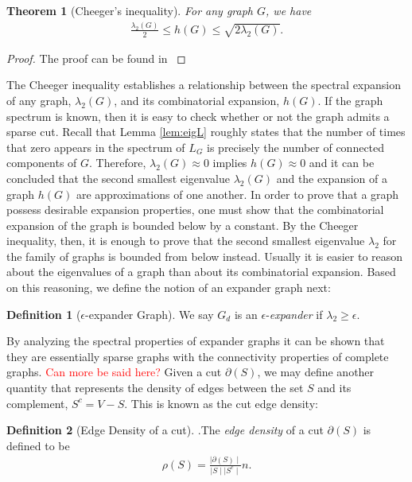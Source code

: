 \documentclass{amsart}
\newtheorem{theorem}{Theorem}
\theoremstyle{definition}
\newtheorem{definition}{Definition}
\theoremstyle{remark}
\numberwithin{equation}{section}
\begin{document}
\begin{theorem}[Cheeger's inequality] \label{thrm:cheeger}
For any graph $G$, we have
\begin{align}\label{eq:cheeger} 
\frac{\lambda_2(G)}{2} \leq h(G) \leq \sqrt{2 \lambda_2(G)}.	
\end{align}
\end{theorem}
\begin{proof}
The proof can be found in \cite{Chung97}
\end{proof}
The Cheeger inequality establishes a relationship between the spectral expansion of any graph, $\lambda_2 (G)$, and its combinatorial expansion, $h(G)$. If the graph spectrum is known, then it is easy to check whether or not the graph admits a sparse cut. Recall that Lemma \ref{lem:eigL} roughly states that the number of times that zero appears in the spectrum of $L_G$ is precisely the number of connected components of $G$. Therefore, $\lambda_2 (G) \approx 0$ implies $h(G) \approx 0$ and it can be concluded that the second smallest eigenvalue $\lambda_2 (G)$ and the expansion of a graph $h(G)$ are approximations of one another. 
In order to prove that a graph possess desirable expansion properties, one must show that the combinatorial expansion of the graph is bounded below by a constant. By the Cheeger inequality, then, it is enough to prove that the second smallest eigenvalue $\lambda_2$ for the family of graphs is bounded from below instead. Usually it is easier to reason about the eigenvalues of a graph than about its combinatorial expansion. Based on this reasoning, we define the notion of an expander graph next:
\begin{definition}[$\epsilon$-expander Graph]\label{def:expander}
We say $G_d$ is an $\epsilon$-\emph{expander} if $\lambda_2\geq \epsilon$.
\end{definition}
By analyzing the spectral properties of expander graphs it can be shown that they are essentially sparse graphs with the connectivity properties of complete graphs. \textcolor{red}{Can more be said here?} Given a cut $\partial (S)$, we may define another quantity that represents the density of edges between the set $S$ and its complement, $S^c = V-S$. This is known as the cut edge density: 
\begin{definition}[Edge Density of a cut].\label{def:edgedensity} The \textit{edge density} of a cut $\partial (S)$ is defined to be
\begin{align}\label{eq:edgedensity}
\rho (S) = \frac{\mid \partial(S) \mid}{\mid S \mid \mid S^c \mid}n.
\end{align}
\end{definition}
\end{document}
